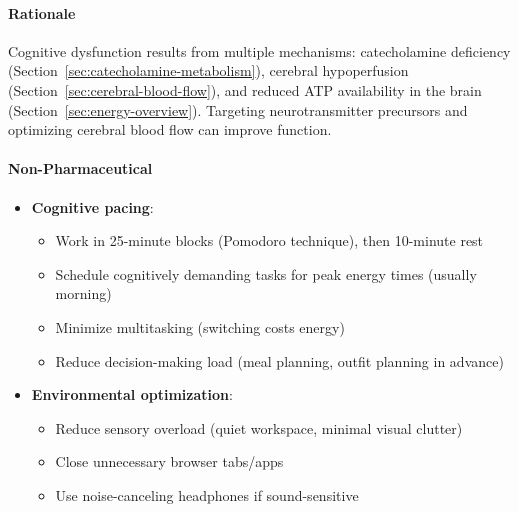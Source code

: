 \paragraph{Rationale}
Cognitive dysfunction results from multiple mechanisms: catecholamine deficiency (Section~\ref{sec:catecholamine-metabolism}), cerebral hypoperfusion (Section~\ref{sec:cerebral-blood-flow}), and reduced ATP availability in the brain (Section~\ref{sec:energy-overview}). Targeting neurotransmitter precursors and optimizing cerebral blood flow can improve function.

\paragraph{Non-Pharmaceutical}
\begin{itemize}
    \item \textbf{Cognitive pacing}:
    \begin{itemize}
        \item Work in 25-minute blocks (Pomodoro technique), then 10-minute rest
        \item Schedule cognitively demanding tasks for peak energy times (usually morning)
        \item Minimize multitasking (switching costs energy)
        \item Reduce decision-making load (meal planning, outfit planning in advance)
    \end{itemize}

    \item \textbf{Environmental optimization}:
    \begin{itemize}
        \item Reduce sensory overload (quiet workspace, minimal visual clutter)
        \item Close unnecessary browser tabs/apps
        \item Use noise-canceling headphones if sound-sensitive
    \end{itemize}
\end{itemize}

